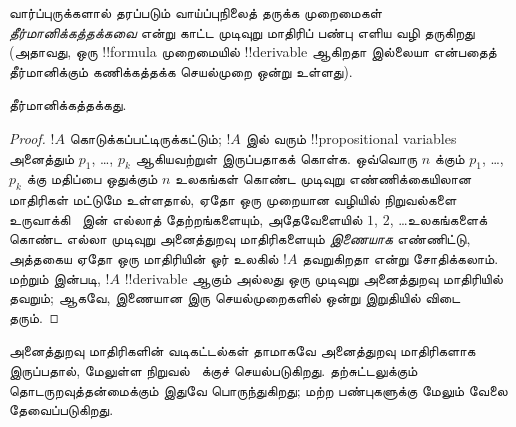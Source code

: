 \documentclass[../../../include/open-logic-section]{subfiles}
\begin{document}

வார்ப்புருக்களால் தரப்படும் வாய்ப்புநிலைத் தருக்க முறைமைகள்
\emph{தீர்மானிக்கத்தக்கவை} என்று காட்ட முடிவுறு மாதிரிப் பண்பு எளிய வழி
தருகிறது (அதாவது, ஒரு !!{formula} முறைமையில் !!{derivable} ஆகிறதா இல்லையா
என்பதைத் தீர்மானிக்கும் கணிக்கத்தக்க செயல்முறை ஒன்று உள்ளது).

\begin{thm}
   தீர்மானிக்கத்தக்கது.
\end{thm}

\begin{proof}
  $!A$ கொடுக்கப்பட்டிருக்கட்டும்; $!A$ இல் வரும் !!{propositional variable}s
  அனைத்தும் $p_1$, \dots, $p_k$ ஆகியவற்றுள் இருப்பதாகக் கொள்க. ஒவ்வொரு
  $n$ க்கும் $p_1$, \dots, $p_k$ க்கு மதிப்பை ஒதுக்கும் $n$ உலகங்கள் கொண்ட
  முடிவுறு எண்ணிக்கையிலான மாதிரிகள் மட்டுமே உள்ளதால், ஏதோ ஒரு முறையான
  வழியில் நிறுவல்களை உருவாக்கி~ இன் எல்லாத் தேற்றங்களையும்,
  அதேவேளையில் $1$, $2$, \dots உலகங்களைக் கொண்ட எல்லா முடிவுறு அனைத்துறவு
  மாதிரிகளையும் \emph{இணையாக} எண்ணிட்டு, அத்தகைய ஏதோ ஒரு மாதிரியின் ஓர்
  உலகில் $!A$ தவறுகிறதா என்று சோதிக்கலாம்.
   மற்றும் 
  இன்படி, $!A$ !!{derivable} ஆகும் அல்லது ஒரு முடிவுறு அனைத்துறவு
  மாதிரியில் தவறும்; ஆகவே, இணையான இரு செயல்முறைகளில் ஒன்று இறுதியில்
  விடை தரும்.
\end{proof}

அனைத்துறவு மாதிரிகளின் வடிகட்டல்கள் தாமாகவே அனைத்துறவு மாதிரிகளாக
இருப்பதால், மேலுள்ள நிறுவல்~ க்குச் செயல்படுகிறது. தற்சுட்டலுக்கும்
தொடருறவுத்தன்மைக்கும் இதுவே பொருந்துகிறது; மற்ற பண்புகளுக்கு மேலும் வேலை
தேவைப்படுகிறது.
\end{document}
